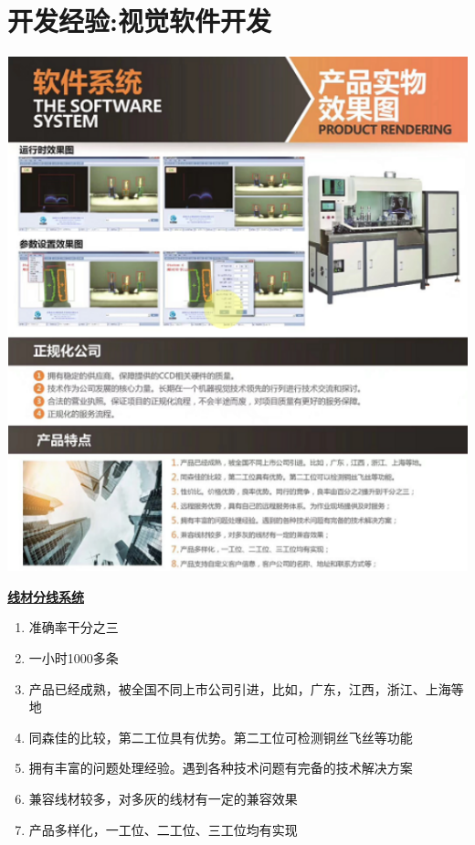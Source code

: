 \documentclass[lighthipster]{simplehipstercv}
\begin{document}
	\begin{minipage}[t]{\textwidth}
		\section*{开发经验:视觉软件开发}
		
		\begin{minipage}[t]{\textwidth}
			\begin{minipage}[thbp]{0.3\textwidth}
				\includegraphics[width=\linewidth]{PrjMy_1.png}
			\end{minipage} \hfill
			\begin{minipage}[thbp!]{0.6\textwidth}
				\textbf{\underline{线材分线系统}}
				\begin{enumerate}
					\item 准确率干分之三
					\item 一小时1000多条
					\item 产品已经成熟，被全国不同上市公司引进，比如，广东，江西，浙江、上海等地
					\item 同森佳的比较，第二工位具有优势。第二工位可检测铜丝飞丝等功能
					\item 拥有丰富的问题处理经验。遇到各种技术问题有完备的技术解决方案
					\item 兼容线材较多，对多灰的线材有一定的兼容效果
					\item 产品多样化，一工位、二工位、三工位均有实现
				\end{enumerate}
				

\end{minipage}
\end{minipage}
\end{minipage}
\end{document}
